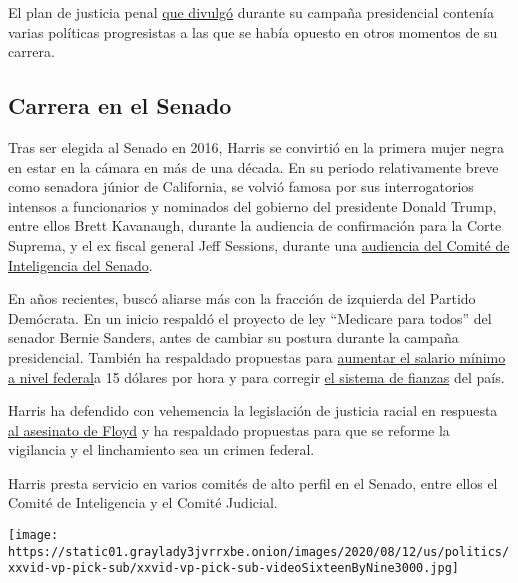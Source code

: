 El plan de justicia penal
\href{https://www.nytimes3xbfgragh.onion/2019/09/09/us/politics/kamala-harris-criminal-justice.html}{que
divulgó} durante su campaña presidencial contenía varias políticas
progresistas a las que se había opuesto en otros momentos de su carrera.

\hypertarget{carrera-en-el-senado}{%
\subsection{Carrera en el Senado}\label{carrera-en-el-senado}}

Tras ser elegida al Senado en 2016, Harris se convirtió en la primera
mujer negra en estar en la cámara en más de una década. En su periodo
relativamente breve como senadora júnior de California, se volvió famosa
por sus interrogatorios intensos a funcionarios y nominados del gobierno
del presidente Donald Trump, entre ellos Brett Kavanaugh, durante la
audiencia de confirmación para la Corte Suprema, y el ex fiscal general
Jeff Sessions, durante una
\href{https://www.nytimes3xbfgragh.onion/2017/06/13/us/politics/kamala-harris-interrupted-jeff-sessions.html}{audiencia
del Comité de Inteligencia del Senado}.

En años recientes, buscó aliarse más con la fracción de izquierda del
Partido Demócrata. En un inicio respaldó el proyecto de ley ``Medicare
para todos'' del senador Bernie Sanders, antes de cambiar su postura
durante la campaña presidencial. También ha respaldado propuestas para
\href{https://www.harris.senate.gov/news/press-releases/senator-harris-joins-colleagues-in-support-of-15-minimum-wage-bill}{aumentar
el salario mínimo a nivel federal}a 15 dólares por hora y para corregir
\href{https://www.nytimes3xbfgragh.onion/2017/07/20/opinion/kamala-harris-and-rand-paul-lets-reform-bail.html}{el
sistema de fianzas} del país.

Harris ha defendido con vehemencia la legislación de justicia racial en
respuesta
\href{https://www.nytimes3xbfgragh.onion/2017/07/20/opinion/kamala-harris-and-rand-paul-lets-reform-bail.html}{al
asesinato de Floyd} y ha respaldado propuestas para que se reforme la
vigilancia y el linchamiento sea un crimen federal.

Harris presta servicio en varios comités de alto perfil en el Senado,
entre ellos el Comité de Inteligencia y el Comité Judicial.

\texttt{[image: https://static01.graylady3jvrrxbe.onion/images/2020/08/12/us/politics/xxvid-vp-pick-sub/xxvid-vp-pick-sub-videoSixteenByNine3000.jpg]}

